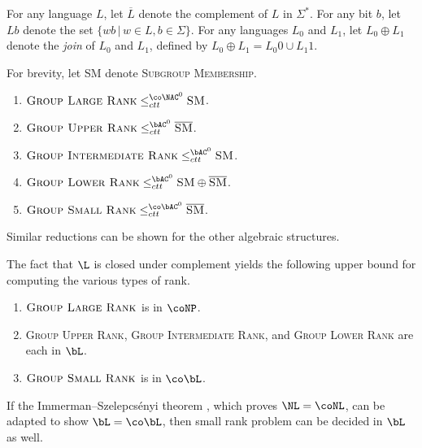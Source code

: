 For any language $L$, let $\overline{L}$ denote the complement of $L$ in $\Sigma^*$.
For any bit $b$, let $Lb$ denote the set $\{ wb \, | \, w \in L, b \in \Sigma\}$.
For any languages $L_0$ and $L_1$, let $L_0 \oplus L_1$ denote the \emph{join} of $L_0$ and $L_1$, defined by $L_0 \oplus L_1 = L_0 0 \cup L_1 1$.

\begin{lemma}
  For brevity, let \textsc{SM} denote \textsc{Subgroup Membership}.
  \mbox{}
  \begin{enumerate}
  \item $\textsc{Group Large Rank} \leq_{ctt}^{\co\NAC^0} \textsc{SM}$.
  \item $\textsc{Group Upper Rank} \leq_{ctt}^{\bAC^0} \overline{\textsc{SM}}$.
  \item $\textsc{Group Intermediate Rank} \leq_{ctt}^{\bAC^0} \textsc{SM}$.
  \item $\textsc{Group Lower Rank} \leq_{ctt}^{\bAC^0} \textsc{SM} \oplus \overline{\textsc{SM}}$.
  \item $\textsc{Group Small Rank} \leq_{ctt}^{\co\bAC^0} \overline{\textsc{SM}}$.
  \end{enumerate}
\end{lemma}

Similar reductions can be shown for the other algebraic structures.

The fact that $\L$ is closed under complement yields the following upper bound for computing the various types of rank.

\begin{theorem}\label{thm:otherranks}
  \mbox{}
  \begin{enumerate}
  \item $\textsc{Group Large Rank}$ is in $\coNP$.
  \item \textsc{Group Upper Rank}, \textsc{Group Intermediate Rank}, and \textsc{Group Lower Rank} are each in $\bL$.
  \item $\textsc{Group Small Rank}$ is in $\co\bL$.
  \end{enumerate}
\end{theorem}

If the Immerman–Szelepcsényi theorem \autocite{immerman88, szelepcsenyi88}, which proves $\NL = \coNL$, can be adapted to show $\bL = \co\bL$, then small rank problem can be decided in $\bL$ as well.
